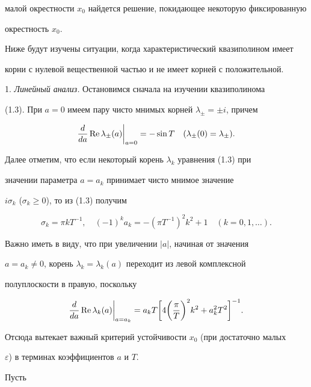 малой окрестности $x_0$ найдется решение, покидающее некоторую фиксированную


окрестность $x_0$.





Ниже будут изучены ситуации, когда характеристический квазиполином имеет


корни с нулевой вещественной частью и не имеет корней с положительной.


\medskip





1. {\it Линейный анализ.} Остановимся сначала на изучении квазиполинома


(1.3). При $a=0$ имеем пару чисто мнимых корней $\lambda_\pm=\pm i$, причем


$$


\frac{d}{da}\re\lambda_\pm(a)\bigg|_{a=0} = -\sin T


\quad (\lambda_\pm(0)=\lambda_\pm).


$$


Далее отметим, что если некоторый корень $\lambda_k$ уравнения (1.3) при


значении параметра $a=a_k$ принимает чисто мнимое значение


$i\sigma_k$ ($\sigma_k\ge 0$), то из (1.3) получим


$$


\sigma_k = \pi kT^{-1}, \quad (-1)^k a_k = -(\pi T^{-1})^2 k^2 + 1 \quad


(k=0,1,\dotsc).


$$


Важно иметь в виду, что при увеличении $|a|$, начиная от значения


$a=a_k\ne 0$, корень $\lambda_k=\lambda_k(a)$ переходит из левой комплексной


полуплоскости в правую, поскольку


$$


\frac{d}{da}\re\lambda_k(a)\bigg|_{a=a_k} = a_k T\bigg[4\bigg(\frac \pi


T\bigg)^2 k^2 + a_k^2 T^2 \bigg]^{-1}.


$$


Отсюда вытекает важный критерий устойчивости $x_0$ (при достаточно малых


$\varepsilon$) в терминах коэффициентов $a$ и $T$.





Пусть


